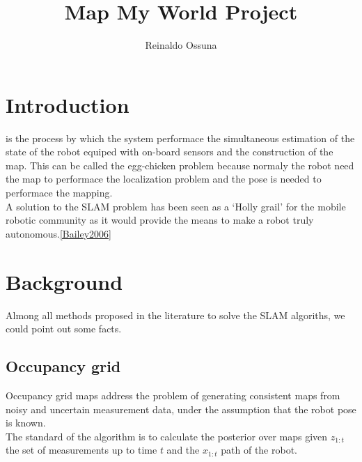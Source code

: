 \documentclass[10pt,journal,compsoc]{IEEEtran}
\begin{document}
\title{Map My World Project}



\author{Reinaldo Ossuna}

%
{}

\maketitle
\IEEEdisplaynontitleabstractindextext
\IEEEpeerreviewmaketitle
\section{Introduction}
\label{sec:introduction}

 is the process by which the system performace the simultaneous estimation of the state of the
robot equiped with on-board sensors and the construction of the map. This can be called the egg-chicken problem because
normaly the robot need the map to performace the localization problem and the pose is needed to performace the
mapping.\\
A solution to the SLAM problem has been seen as a `Holly grail' for the mobile robotic community as it would provide the
means to make a robot truly autonomous.\ref{Bailey2006}


\section{Background}

Almong all methods proposed in the literature to solve the SLAM algoriths, we could point out some facts.

\subsection{Occupancy grid}

Occupancy grid maps address the problem of generating consistent maps from noisy and uncertain measurement data, under
the assumption that the robot pose is known.\\
The standard of the algorithm is to calculate the posterior over maps given $z_{1:t}$ the set of measurements up to time
$t$ and the $x_{1:t}$ path of the robot.
\end{document}
